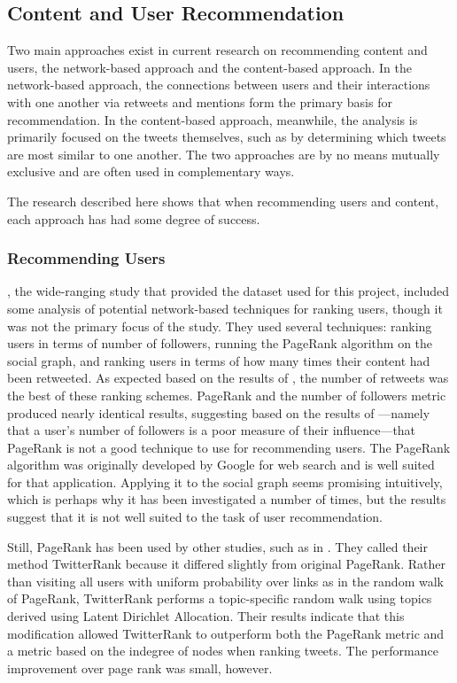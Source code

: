 \subsection{Content and User Recommendation}
\label{sec:ContentRecommendationResearch}

Two main approaches exist in current research on recommending content and users, the network-based approach and the content-based approach. In the network-based approach, the connections between users and their interactions with one another via retweets and mentions form the primary basis for recommendation. In the content-based approach, meanwhile, the analysis is primarily focused on the tweets themselves, such as by determining which tweets are most similar to one another. The two approaches are by no means mutually exclusive and are often used in complementary ways.

The research described here shows that when recommending users and content, each approach has had some degree of success.

\subsubsection{Recommending Users}

\cite{Kwak2010}, the wide-ranging study that provided the dataset used for this project, included some analysis of potential network-based techniques for ranking users, though it was not the primary focus of the study. They used several techniques: ranking users in terms of number of followers, running the PageRank algorithm on the social graph, and ranking users in terms of how many times their content had been retweeted. As expected based on the results of \cite{Welch2011}, the number of retweets was the best of these ranking schemes. PageRank and the number of followers metric produced nearly identical results, suggesting based on the results of \cite{Cha2010}---namely that a user's number of followers is a poor measure of their influence---that PageRank is not a good technique to use for recommending users. The PageRank algorithm was originally developed by Google for web search and is well suited for that application. Applying it to the social graph seems promising intuitively, which is perhaps why it has been investigated a number of times, but the results suggest that it is not well suited to the task of user recommendation.

Still, PageRank has been used by other studies, such as in \cite{Weng2010}. They called their method TwitterRank because it differed slightly from original PageRank. Rather than visiting all users with uniform probability over links as in the random walk of PageRank, TwitterRank performs a topic-specific random walk using topics derived using Latent Dirichlet Allocation. Their results indicate that this modification allowed TwitterRank to outperform both the PageRank metric and a metric based on the indegree of nodes when ranking tweets. The performance improvement over page rank was small, however.

